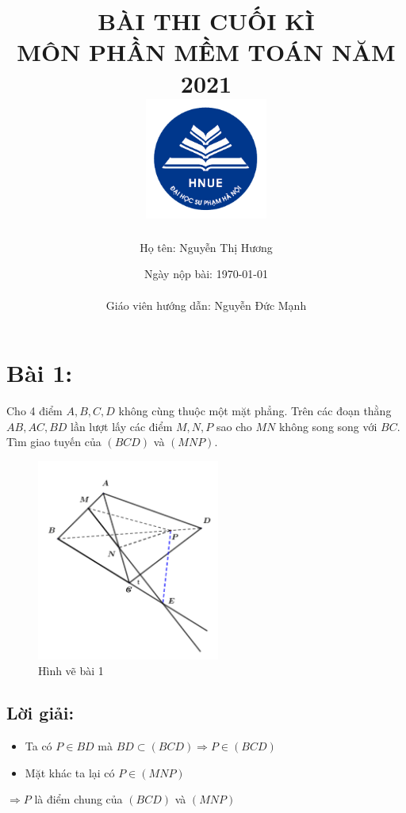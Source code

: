 \documentclass[13pt, a4paper, titlepage]{report}
\begin{document}
\title{BÀI THI CUỐI KÌ \\
		MÔN PHẦN MỀM TOÁN NĂM 2021 \\[4ex]
		\includegraphics[width=4cm]{images/cover/dhsp_logo.png}}
\author{Họ tên: Nguyễn Thị Hương} 
\date{Ngày nộp bài: \today \\
\ \\
Giáo viên hướng dẫn: Nguyễn Đức Mạnh}
\maketitle

%
\section*{Bài 1:}
Cho 4 điểm $A, B, C, D$ không cùng thuộc một mặt phẳng. Trên các đoạn thằng $AB, AC, BD$ lần lượt lấy các điểm $M, N, P$ sao cho $MN$ không song song với $BC$. Tìm giao tuyến của $(BCD)$ và $(MNP)$.
\begin{figure}[H]
\centering
\includegraphics[width=6cm]{images/quizz1/quizz_1_figure.png}
\caption{Hình vẽ bài 1}
\end{figure}

\subsection*{Lời giải:}
\begin{itemize}
\item Ta có $P \in BD$ mà $BD \subset (BCD) \Rightarrow P \in (BCD)$ 
\item Mặt khác ta lại có $ P \in (MNP) $
\end{itemize}
$\Rightarrow P$ là điểm chung của $(BCD)$ và $(MNP)$
\end{document}
